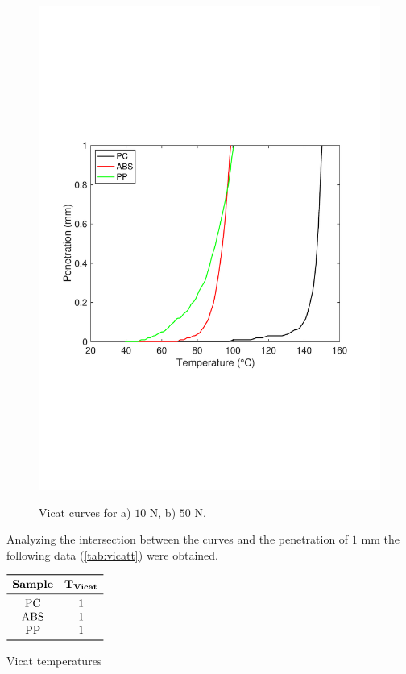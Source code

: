 \documentclass[a4paper, 11pt]{article}
\begin{document}
\begin{figure}[htp]
	{\includegraphics[scale=0.36]{vicat50}}\qquad
	\captionsetup{justification=centering}
	\caption{Vicat curves for a) $10$ N, b) $50$ N.}
	\label{fig:vicat}
\end{figure}

Analyzing the intersection between the curves and the penetration of $1$ mm the following data (\ref{tab:vicatt}) were obtained.

\begin{table}[htp]
	\centering
	$
	\begin{array}{cc}
	\toprule
	\textbf{Sample} & \mathbf{T_{Vicat}}\\
	\midrule
	\text{PC} & 1\\
	\text{ABS} & 1\\
	\text{PP} & 1\\
	\bottomrule
	\end{array}
	$
	\caption{Vicat temperatures}
	\label{tab:vicatt}
\end{table}
\end{document}
